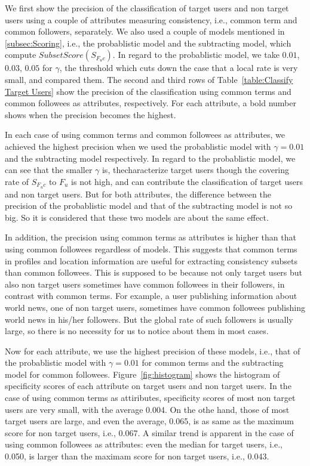 We first show the precision of the classification of target users and
non target users using a couple of attributes measuring consistency,
i.e., common term and common followers, separately.  We also used a
couple of models mentioned in \ref{subsec:Scoring}, i.e., the
probablistic model and the subtracting model, which compute
$\mathit{SubsetScore}(S_{F_uc})$.  In regard to the probablistic model,
we take $0.01$, $0.03$, $0.05$ for $\gamma$, the threshold which cuts
down the case that a local rate is very small, and
compared them.  The second and third rows of Table~\ref{table:Classify
Target Users} show the precision of the classification using common
terms and common followees as attributes, respectively.  For each
attribute, a bold number shows when the precision becomes the highest.

In each case of using common terms and common followees as attributes,
we achieved the highest precision when we used the probablistic model
with $\gamma = 0.01$ and the subtracting model respectively.  In regard
to the probablistic model, we can see that the smaller $\gamma$ is,
thecharacterize target users though the covering rate of $S_{F_uc}$ to
$F_u$ is not high, and can contribute the classification of target users
and non target users.  But for both attributes, the difference between
the precision of the probablistic model and that of the subtracting
model is not so big.  So it is considered that these two models are
about the same effect.

In addition, the precision using common terms as attributes is higher
than that using common followees regardless of models.  This suggests
that common terms in profiles and location information are useful for
extracting consistency subsets than common followees.  This is supposed
to be because not only target users but also non target users sometimes
have common followees in their followers, in contrast with common terms.
For example, a user publishing information about world news, one of non
target users, sometimes have common followees publishing world news in
his/her followers.  But the global rate of such followers is usually
large, so there is no necessity for us to notice about them in most
cases.

Now for each attribute, we use the highest precision of these models,
i.e., that of the probablistic model with $\gamma=0.01$ for common terms
and the subtracting model for common
followees. Figure~\ref{fig:histogram} shows the histogram of specificity
scores of each attribute on target users and non target users.  In the
case of using common terms as attiributes, specificity scores of most
non target users are very small, with the average 0.004.  On the othe
hand, those of most target users are large, and even the average, 0.065,
is as same as the maximum score for non target users, i.e., 0.067.  A
similar trend is apparent in the case of using common followees as
attributes: even the median for target users, i.e., 0.050, is larger
than the maximam score for non target users, i.e., 0.043.

